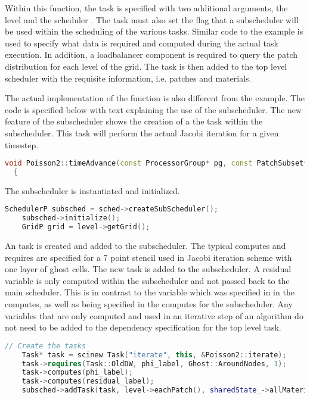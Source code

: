Within this function, the task is specified with two additional
arguments, the level and the scheduler .  The
task must also set the flag that a subscheduler will be used within
the scheduling of the various tasks.  Similar code to the
 example is used to specify what data is required and
computed during the actual task execution.  In addition, a
loadbalancer component is required to query the patch distribution for
each level of the grid.  The task is then added to the top level
scheduler with the requisite information, i.e. patches and materials.

The actual implementation of the  function is also
different from the  example.  The code is specified
below with text explaining the use of the subscheduler.  The new
feature of the subscheduler shows the creation of a the
 task within the subscheduler.  This task will perform
the actual Jacobi iteration for a given timestep.

\begin{lstlisting}[language=Cpp]
  void Poisson2::timeAdvance(const ProcessorGroup* pg, const PatchSubset* patches, const MaterialSubset* matls, DataWarehouse* old_dw, DataWarehouse* new_dw, LevelP level, Scheduler* sched)
  {
  \end{lstlisting}

  The subscheduler is instantiated and initialized. 

  \begin{lstlisting}[language=Cpp]
    SchedulerP subsched = sched->createSubScheduler();
    subsched->initialize();
    GridP grid = level->getGrid();
  \end{lstlisting}

  An  task is created and added to the subscheduler.
  The typical computes and requires are specified for a 7 point stencil
  used in Jacobi iteration scheme with one layer of ghost cells.  The
  new task is added to the subscheduler.  A residual variable is only
  computed within the subscheduler and not passed back to the main
  scheduler.  This is in contrast to the  variable which was
  specified in  in the computes, as well as
  being specified in the computes for the subscheduler.  Any variables
  that are only computed and used in an iterative step of an algorithm
  do not need to be added to the dependency specification for the top
  level task.

  \begin{lstlisting}[language=Cpp]
    // Create the tasks
    Task* task = scinew Task("iterate", this, &Poisson2::iterate);
    task->requires(Task::OldDW, phi_label, Ghost::AroundNodes, 1);
    task->computes(phi_label);
    task->computes(residual_label);
    subsched->addTask(task, level->eachPatch(), sharedState_->allMaterials());
  \end{lstlisting}

